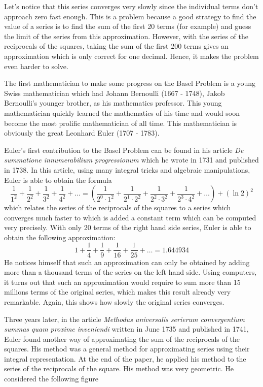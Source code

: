 Let's notice that this series converges very slowly since the individual terms don't approach zero fast enough. This is a problem because a good strategy to find the value of a series is to find the sum of the first 20 terms (for example) and guess the limit of the series from this approximation. However, with the series of the reciprocals of the squares, taking the sum of the first 200 terms gives an approximation which is only correct for one decimal. Hence, it makes the problem even harder to solve.

The first mathematician to make some progress on the Basel Problem is a young Swiss mathematician which had Johann Bernoulli (1667 - 1748), Jakob Bernoulli's younger brother, as his mathematics professor. This young mathematician quickly learned the mathematics of his time and would soon become the most prolific mathematician of all time. This mathematician is obviously the great Leonhard Euler (1707 - 1783). 

Euler's first contribution to the Basel Problem can be found in his article \textit{De summatione innumerabilium progressionum} \cite{eulerE20} which he wrote in 1731 and published in 1738. In this article, using many integral tricks and algebraic manipulations, Euler is able to obtain the formula
$$\frac{1}{1^2} + \frac{1}{2^2} + \frac{1}{3^2} + \frac{1}{4^2} + \dots = \left(\frac{1}{2^0\cdot 1^2} + \frac{1}{2^1\cdot 2^2} + \frac{1}{2^2\cdot 3^2} + \frac{1}{2^3\cdot 4^2} + \dots \right) + (\ln 2)^2$$
which relates the series of the reciprocals of the squares to a series which converges much faster to which is added a constant term which can be computed very precisely. With only 20 terms of the right hand side series, Euler is able to obtain the following approximation:
$$1 + \frac{1}{4} + \frac{1}{9} + \frac{1}{16} + \frac{1}{25} + \dots = 1.644934$$
He notices himself that such an approximation can only be obtained by adding more than a thousand terms of the series on the left hand side. Using computers, it turns out that such an approximation would require to sum more than 15 millions terms of the original series, which makes this result already very remarkable. Again, this shows how slowly the original series converges.

Three years later, in the article \textit{Methodus universalis serierum convergentium summas quam proxime inveniendi} \cite{eulerE46} written in June 1735 and published in 1741, Euler found another way of approximating the sum of the reciprocals of the squares. His method was a general method for approximating series using their integral representation. At the end of the paper, he applied his method to the series of the reciprocals of the square. His method was very geometric. He considered the following figure

